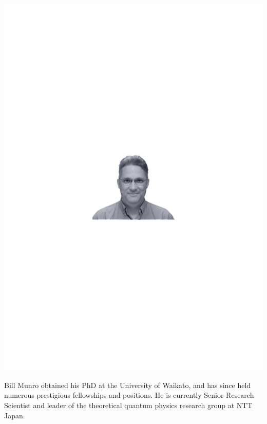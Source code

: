\includegraphics[width=\columnwidth]{photo_bill_munro}

Bill Munro obtained his PhD at the University of Waikato, and has since held numerous prestigious fellowships and positions. He is currently Senior Research Scientist and leader of the theoretical quantum physics research group at NTT Japan.

